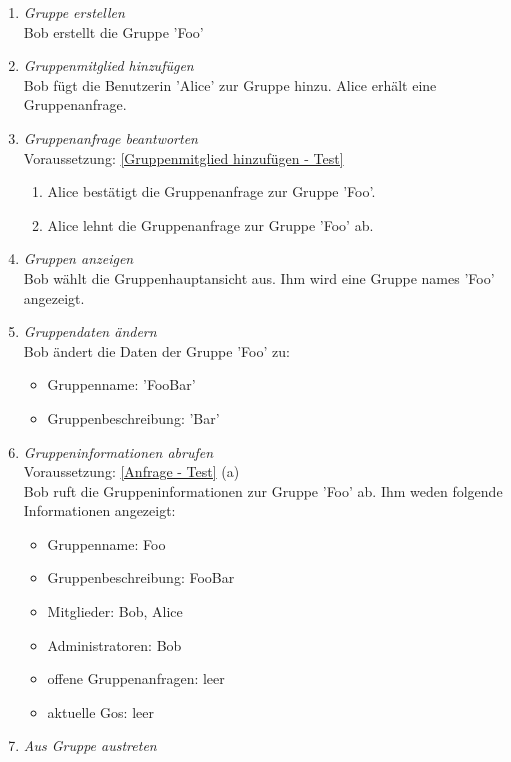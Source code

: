 \documentclass[parskip=full]{scrartcl}
\def\threedigits#1{%
  \ifnum#1<100 0\fi
  \ifnum#1<10 0\fi
  \number#1}
\begin{document}
\begin{enumerate}[label={\textbf{/T\protect\threedigits{\theenumi}0/}}, leftmargin=*, resume]
	\item \textit{Gruppe erstellen} \\ Bob erstellt die Gruppe 'Foo'
	\item \textit{Gruppenmitglied hinzufügen} \label{Gruppenmitglied hinzufügen - Test} \\ Bob fügt die Benutzerin 'Alice' zur Gruppe hinzu. Alice erhält eine Gruppenanfrage.
	\item \textit{Gruppenanfrage beantworten} \label{Anfrage - Test} \\ Voraussetzung: \ref{Gruppenmitglied hinzufügen - Test}
	\begin{enumerate}
		\item Alice bestätigt die Gruppenanfrage zur Gruppe 'Foo'.
		\item Alice lehnt die Gruppenanfrage zur Gruppe 'Foo' ab.
	\end{enumerate}
	\item \textit{Gruppen anzeigen} \\ Bob wählt die Gruppenhauptansicht aus. Ihm wird eine Gruppe names 'Foo' angezeigt.
	\item \textit{Gruppendaten ändern}\\ Bob ändert die Daten der Gruppe 'Foo' zu:
	\begin{itemize}
		\item Gruppenname: 'FooBar'
		\item Gruppenbeschreibung: 'Bar'
	\end{itemize}
	\item \textit{Gruppeninformationen abrufen} \\
	Voraussetzung: \ref{Anfrage - Test} (a)\\
	Bob ruft die Gruppeninformationen zur Gruppe 'Foo' ab. Ihm weden folgende Informationen angezeigt:
	\begin{itemize}
		\item Gruppenname: Foo
		\item Gruppenbeschreibung: FooBar
		\item Mitglieder: Bob, Alice
		\item Administratoren: Bob
		\item offene Gruppenanfragen: leer
		\item aktuelle Gos: leer
	\end{itemize}
	\item \textit{Aus Gruppe austreten}
	\begin{itemize}

\end{itemize}
\end{enumerate}
\end{document}
